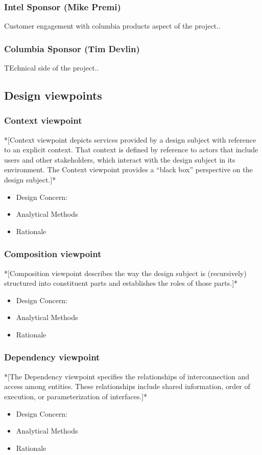 \documentclass[10pt,journal,compsoc,onecolumn, draftclsnofoot]{IEEEtran}
\begin{document}
\subsubsection{Intel Sponsor (Mike Premi)}
Customer engagement with columbia products aspect of the project..
\subsubsection{Columbia Sponsor (Tim Devlin)}
TEchnical side of the project..

\subsection{Design viewpoints}
\subsubsection{Context viewpoint}
*[Context viewpoint depicts services provided by a design subject with reference to an explicit context. That context is defined by reference to actors that include users and other stakeholders, which interact with the design subject in its environment. The Context viewpoint provides a “black box” perspective on the design subject.]*
\begin{itemize}
  \item Design Concern:
  \item Analytical Methods
  \item Rationale
\end{itemize}

\subsubsection{Composition viewpoint}
*[Composition viewpoint describes the way the design subject is (recursively) structured into constituent parts and establishes the roles of those parts.]*
\begin{itemize}
  \item Design Concern:
  \item Analytical Methods
  \item Rationale
\end{itemize}

\subsubsection{Dependency viewpoint}
*[The Dependency viewpoint specifies the relationships of interconnection and access among entities. These relationships include shared information, order of execution, or parameterization of interfaces.]*
\begin{itemize}
  \item Design Concern:
  \item Analytical Methods
  \item Rationale
\end{itemize}
\end{document}

